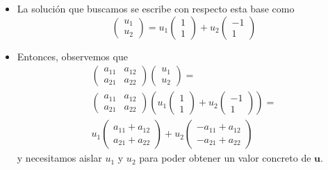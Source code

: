 \documentclass[10pt,handout]{beamer}
\theoremstyle{plain} %
\theoremstyle{plain} %
\theoremstyle{plain} %
\theoremstyle{plain} %
\theoremstyle{definition}
\theoremstyle{example}
\theoremstyle{example}
\theoremstyle{remark}
\theoremstyle{remark}
\begin{document}
\begin{frame}
\begin{itemize}
\item La solución que buscamos se escribe con respecto esta base como
$$
\left(
\begin{array}{c}
u_1 \\ 
u_2
\end{array}
\right) = u_1 \left(
\begin{array}{c}
1 \\ 
1
\end{array}
\right) + u_2 \left(
\begin{array}{r}
-1 \\ 
1
\end{array}
\right)
$$
\item Entonces, observemos que
\begin{align*}
\left(
\begin{array}{cc}
a_{11} & a_{12} \\ 
a_{21} & a_{22}
\end{array}
\right) \left(
\begin{array}{c}
u_1 \\ 
u_2
\end{array}
\right)= \\ \left(
\begin{array}{cc}
a_{11} & a_{12} \\ 
a_{21} & a_{22}
\end{array}
\right) \left(u_1 \left(
\begin{array}{c}
1 \\ 
1
\end{array}
\right) + u_2 \left(
\begin{array}{r}
-1 \\ 
1
\end{array}
\right)\right) = \\ 
u_1 \left(
\begin{array}{c}
a_{11}+a_{12} \\ 
a_{21}+a_{22}
\end{array}
\right) + u_2 \left(
\begin{array}{c}
-a_{11}+a_{12} \\ 
-a_{21}+a_{22}
\end{array}
\right)
\end{align*}
y necesitamos aislar $u_1$ y $u_2$ para poder obtener un valor concreto de $\mathbf{u}.$
\end{itemize}
\end{frame}
\end{document}
